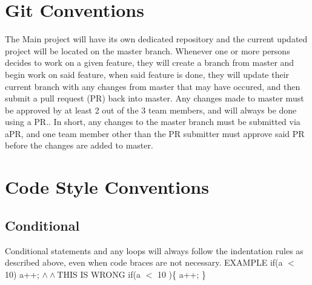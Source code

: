 \documentclass{article}
\begin{document}
\section{Git Conventions }
The Main project will have its own dedicated repository and the current updated project will be located on the master branch. Whenever one or more persons decides to work on a given feature, they will create a branch from master and begin work on said feature, when said feature is done, they will update their current branch with any changes from master that may have occured, and then submit a pull request (PR) back into master. Any changes made to master must be approved by at least 2 out of the 3 team members, and will always be done using a PR.. In short, any changes to the master branch must be submitted via aPR, and one team member other than the PR submitter must approve said PR before the changes are added to master.

\section{Code Style Conventions}
\subsection{Conditional}
Conditional statements and any loops will always follow the indentation rules as described above, even when code braces are not necessary. \newline 
EXAMPLE 
\newline 
if(a $<$ 10) \newline
\hspace*{1cm}a++; \newline \newline
$\wedge \wedge $THIS IS WRONG \newline 
\newline
if(a $<$ 10 )\{ \newline
\hspace*{1cm}a++; \newline 
\}
\end{document}

